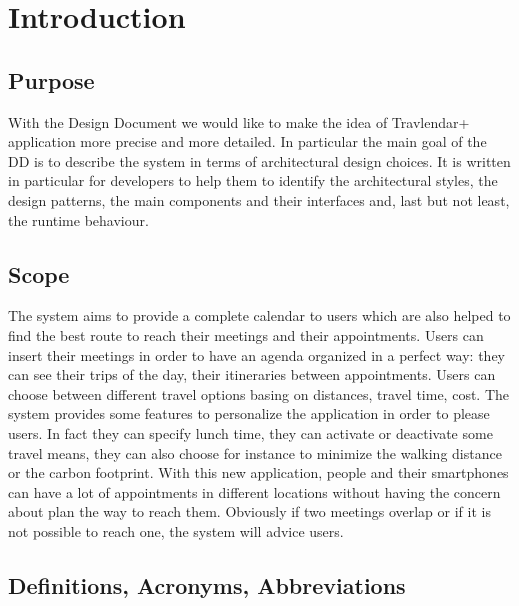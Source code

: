 \documentclass[12pt,titlepage]{article}
\begin{document}
\tableofcontents

\pagebreak

\section{Introduction} \label{introduzione}
\subsection{Purpose}
With the Design Document we would like to make the idea of Travlendar+ application more precise and more detailed.
In particular the main goal of the DD is  to describe the system in terms of architectural design choices.
It is written in particular for developers to help them to identify the architectural styles, the design patterns, the main components and their interfaces and, last but not least, the runtime behaviour.


\subsection{Scope}
The system aims to provide a complete calendar to users which are also helped to find the best route to reach their meetings and their appointments. 
Users can insert their meetings in order to have an agenda organized in a perfect way: they can see their trips of the day, their itineraries between appointments. Users can choose between different travel options basing on distances, travel time, cost.
The system provides some features to personalize the application in order to please users. In fact they can specify lunch time, they can activate or deactivate some travel means, they can also  choose for instance to minimize the walking distance or the carbon footprint. 
With this new application, people and their smartphones can have a lot of appointments in different locations without having the concern about plan the way to reach them. Obviously if two meetings overlap or if it is not possible to reach one, the system will advice users.

\subsection{Definitions, Acronyms, Abbreviations}
\end{document}

